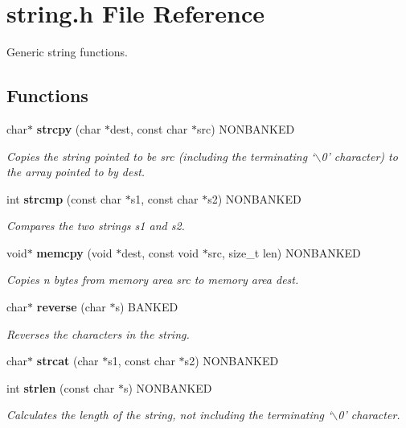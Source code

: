 \section{string.h File Reference}
\label{string.h}
Generic string functions. 


\subsection*{Functions}
\begin{CompactItemize}
\item 
char$\ast$ {\bf strcpy} (char $\ast$dest, const char $\ast$src) NONBANKED
\begin{CompactList}\small\item\em Copies the string pointed to be src (including the terminating `$\backslash$0' character) to the array pointed to by dest.\item\end{CompactList}

\item 
int {\bf strcmp} (const char $\ast$s1, const char $\ast$s2) NONBANKED
\begin{CompactList}\small\item\em Compares the two strings s1 and s2.\item\end{CompactList}

\item 
void$\ast$ {\bf memcpy} (void $\ast$dest, const void $\ast$src, size\_\-t len) NONBANKED
\begin{CompactList}\small\item\em Copies n bytes from memory area src to memory area dest.\item\end{CompactList}

\item 
char$\ast$ {\bf reverse} (char $\ast$s) BANKED
\begin{CompactList}\small\item\em Reverses the characters in the string.\item\end{CompactList}

\item 
\label{string.h_a4}
char$\ast$ {\bf strcat} (char $\ast$s1, const char $\ast$s2) NONBANKED
\item 
\label{string.h_a5}
int {\bf strlen} (const char $\ast$s) NONBANKED
\begin{CompactList}\small\item\em Calculates the length of the string, not including the terminating `$\backslash$0' character.\item\end{CompactList}


\end{CompactItemize}
